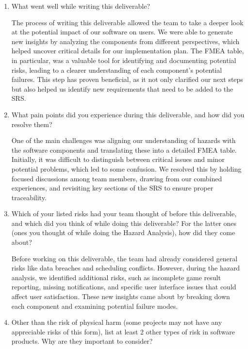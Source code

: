 \documentclass{article}
\begin{document}
\begin{enumerate}
    \item What went well while writing this deliverable? 
    
    The process of writing this deliverable allowed the team to take a deeper look at the potential impact of our software on users. We were able to generate new insights by analyzing the components from different perspectives, which helped uncover critical details for our implementation plan. The FMEA table, in particular, was a valuable tool for identifying and documenting potential risks, leading to a clearer understanding of each component's potential failures. This step has proven beneficial, as it not only clarified our next steps but also helped us identify new requirements that need to be added to the SRS.

    \item What pain points did you experience during this deliverable, and how
    did you resolve them?

    One of the main challenges was aligning our understanding of hazards with the software components and translating these into a detailed FMEA table. Initially, it was difficult to distinguish between critical issues and minor potential problems, which led to some confusion. We resolved this by holding focused discussions among team members, drawing from our combined experiences, and revisiting key sections of the SRS to ensure proper traceability.

    \item Which of your listed risks had your team thought of before this
    deliverable, and which did you think of while doing this deliverable? For
    the latter ones (ones you thought of while doing the Hazard Analysis), how
    did they come about?

    Before working on this deliverable, the team had already considered general risks like data breaches and scheduling conflicts. However, during the hazard analysis, we identified additional risks, such as incomplete game result reporting, missing notifications, and specific user interface issues that could affect user satisfaction. These new insights came about by breaking down each component and examining potential failure modes.

    \item Other than the risk of physical harm (some projects may not have any
    appreciable risks of this form), list at least 2 other types of risk in
    software products. Why are they important to consider?


\end{enumerate}
\end{document}
